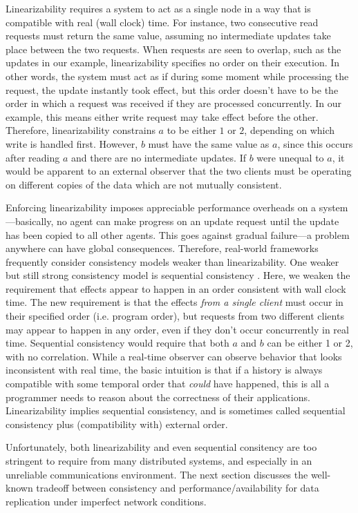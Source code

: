 Linearizability requires a system to act as a single node in a way
that is compatible with real (wall clock) time. For instance, two
consecutive read requests must return the same value, assuming no
intermediate updates take place between the two requests. When
requests are seen to overlap, such as the updates in our example,
linearizability specifies no order on their execution. In other words,
the system must act as if during some moment while processing the
request, the update instantly took effect, but this order doesn't have
to be the order in which a request was received if they are processed
concurrently. In our example, this means either write request may take
effect before the other. Therefore, linearizability constrains $a$ to
be either $1$ or $2$, depending on which write is handled
first. However, $b$ must have the same value as $a$, since this occurs
after reading $a$ and there are no intermediate updates. If $b$ were
unequal to $a$, it would be apparent to an external observer that the
two clients must be operating on different copies of the data which
are not mutually consistent.

Enforcing linearizability imposes appreciable performance overheads on
a system---basically, no agent can make progress on an update request
until the update has been copied to all other agents. This goes
against gradual failure---a problem anywhere can have global
consequences. Therefore, real-world frameworks frequently consider
consistency models weaker than linearizability. One weaker but still
strong consistency model is sequential consistency \cite{}. Here, we
weaken the requirement that effects appear to happen in an order
consistent with wall clock time. The new requirement is that the
effects \emph{from a single client} must occur in their specified
order (i.e. program order), but requests from two different clients
may appear to happen in any order, even if they don't occur
concurrently in real time. Sequential consistency would require that
both $a$ and $b$ can be either 1 or 2, with no correlation. While a
real-time observer can observe behavior that looks inconsistent with
real time, the basic intuition is that if a history is always
compatible with some temporal order that \emph{could} have happened,
this is all a programmer needs to reason about the correctness of
their applications. Linearizability implies sequential consistency,
and is sometimes called sequential consistency plus (compatibility
with) external order.

Unfortunately, both linearizability and even sequential consitency are
too stringent to require from many distributed systems, and especially
in an unreliable communications environment. The next section
discusses the well-known tradeoff between consistency and
performance/availability for data replication under imperfect network
conditions.

